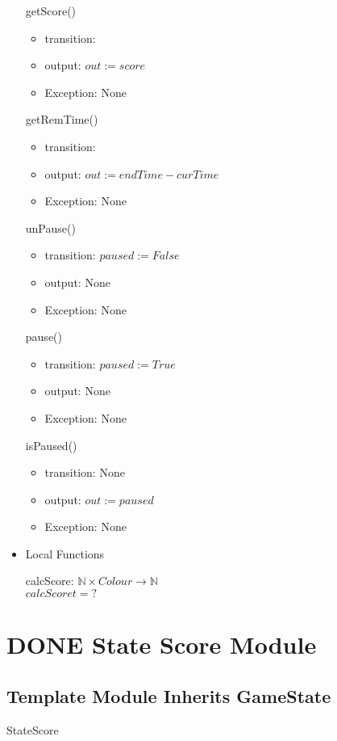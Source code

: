 \documentclass[11pt]{article}
\begin{document}
\begin{itemize}
getScore()
\begin{itemize}
\item transition:
\item output: \(out := score\)
\item Exception: None
\end{itemize}

getRemTime()
\begin{itemize}
\item transition:
\item output: \(out := endTime - curTime\)
\item Exception: None
\end{itemize}

unPause()
\begin{itemize}
\item transition: \(paused := False\)
\item output: None
\item Exception: None
\end{itemize}

pause()
\begin{itemize}
\item transition: \(paused := True\)
\item output: None
\item Exception: None
\end{itemize}

isPaused()
\begin{itemize}
\item transition: None
\item output: \(out := paused\)
\item Exception: None
\end{itemize}

\item Local Functions
\label{sec:orgdfcccda}

calcScore: \(\mathbb{N} \times Colour \rightarrow \mathbb{N}\) \\
\(calcScore t = ?\)

\newpage
\end{itemize}
\section{{\bfseries\sffamily DONE} State Score Module}
\label{sec:org41ada9b}
\subsection*{Template Module Inherits GameState}
\label{sec:org861bf70}
StateScore
\end{document}
